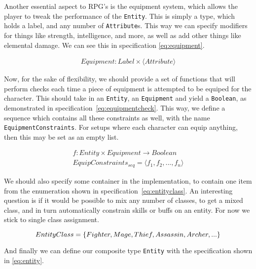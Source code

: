 Another essential aspect to RPG's is the equipment system, which allows the
player to tweak the performance of the \texttt{Entity}. This is simply a type,
which holds a label, and any number of \texttt{Attribute}s. This way we can
specify modifiers for things like strength, intelligence, and more, as well as
add other things like elemental damage. We can see this in specification
\ref{eq:equipment}.

\begin{equation}
\begin{split}
  \label{eq:equipment}
  Equipment\colon Label \times \langle Attribute \rangle
\end{split}
\end{equation}

Now, for the sake of flexibility, we should provide a set of functions that will
perform checks each time a piece of equipment is attempted to be equiped for the
character. This should take in an \texttt{Entity}, an \texttt{Equipment} and
yield a \texttt{Boolean}, as demonstrated in
specification~\ref{eq:equipmentcheck}. This way, we define a sequence which
contains all these constraints as well, with the name
\texttt{EquipmentConstraints}. For setups where each character can equip
anything, then this may be set as an empty list.

\begin{equation}
\begin{split}
  \label{eq:equipmentcheck}
  f\colon Entity \times Equipment \to Boolean \\
  EquipConstraints_{seq} = \langle f_1, f_2, ..., f_n \rangle
\end{split}
\end{equation}

We should also specify some container in the implementation, to contain one item
from the enumeration shown in specification~\ref{eq:entityclass}. An interesting
question is if it would be possible to mix any number of classes, to get a mixed
class, and in turn automatically constrain skills or buffs on an entity. For now
we stick to single class assignment.

\begin{equation}
  \label{eq:entityclass}
  EntityClass = \{ Fighter, Mage, Thief, Assassin, Archer, ... \} \\
\end{equation}

And finally we can define our composite type \texttt{Entity} with the
specification shown in \ref{eq:entity}.

